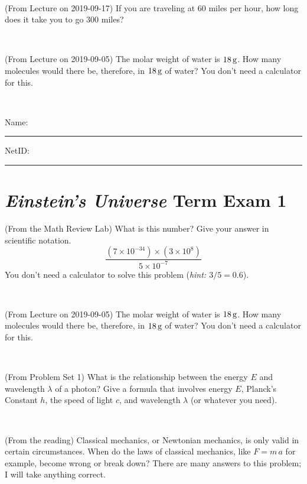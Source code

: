 \documentclass[12pt, letterpaper]{article}
\begin{document}
\vfill ~

\begin{problem} (From Lecture on 2019-09-17)
If you are traveling at 60 miles per hour, how long does
it take you to go 300 miles?
\end{problem}


\vfill ~

\begin{problem} (From Lecture on 2019-09-05)
The molar weight of water is $18\,\mathrm{g}$. How many molecules would there
be, therefore, in $18\,\mathrm{g}$ of water? You don't need a calculator for
this.
\end{problem}


\vfill ~


\cleardoublepage



\noindent
Name: \rule[-1ex]{0.60\textwidth}{0.1pt}
NetID: \rule[-1ex]{0.20\textwidth}{0.1pt}

\section*{\textsl{Einstein's Universe} Term Exam 1}
\setcounter{problem}{1}


\begin{problem} (From the Math Review Lab)
What is this number? Give your answer in scientific notation.
$$
\frac{(7\times10^{-34})\times(3\times10^8)}{5\times10^{-7}}
$$
You don't need a calculator to solve this problem (\textit{hint: $3/5=0.6$}).
\end{problem}


\vfill ~

\begin{problem} (From Lecture on 2019-09-05)
The molar weight of water is $18\,\mathrm{g}$. How many molecules would there
be, therefore, in $18\,\mathrm{g}$ of water? You don't need a calculator for
this.
\end{problem}


\vfill ~

\begin{problem} (From Problem Set 1)
What is the relationship between the energy $E$ and wavelength
$\lambda$ of a photon? Give a formula that involves energy $E$,
Planck's Constant $h$, the speed of light $c$, and wavelength
$\lambda$ (or whatever you need).
\end{problem}

\vfill ~

\begin{problem} (From the reading)
Classical mechanics, or Newtonian mechanics, is only valid in certain
circumstances. When do the laws of classical mechanics, like $F =
m\,a$ for example, become wrong or break down? There are many answers
to this problem; I will take anything correct.
\end{problem}
\end{document}
